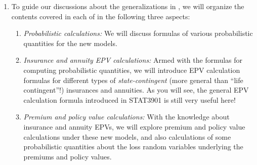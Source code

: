 \begin{enumerate}
 is about a more practically useful topic, namely
analyzing \emph{profits}. The ultimate goal of selling insurance products is to
make profits (right?), so certainly this is a topic deserving attention. We put
it at the last as we are going to apply some concepts learnt in the prior
sections to the profit analysis. This section is perhaps (?) the easiest part
in STAT3909 and can be your ``grade saver'' .\footnote{Note
however that \(\text{``easiest''}\ne\text{``easy''}\). Certainly, you still need
to pay (substantial) effort on studying this section in order for it to
``save your grade'' (hopefully).}

\item To guide our discussions about the generalizations in
, we
will organize the contents covered in each of
 in
the following three aspects:
\begin{enumerate}[label={(\arabic*)}]
\item \emph{Probabilistic calculations:} We will discuss formulas of various
probabilistic quantities for the new models.

\item \emph{Insurance and annuity EPV calculations:} Armed with the formulas
for computing probabilistic quantities, we will introduce EPV calculation
formulas for different types of \emph{state-contingent} (more general than
``life contingent''!) insurances and annuities. As you will see, the general
EPV calculation formula introduced in STAT3901 is still very useful
 here!

\item \emph{Premium and policy value calculations:} With the knowledge about
insurance and annuity EPVs, we will explore premium and policy value
calculations under these new models, and also calculations of some
probabilistic quantities about the loss random variables underlying the
premiums and policy values.
\end{enumerate}
\end{enumerate}
